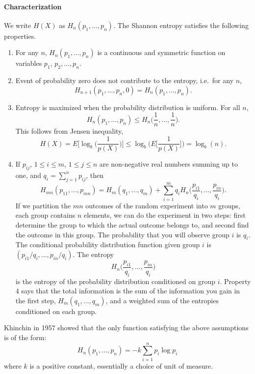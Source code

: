 \documentclass{article}
\begin{document}
\paragraph{Characterization}

We write $H(X)$ as $H_n(p_1,\ldots,p_n)$. The Shannon entropy
satisfies the following properties.

\begin{enumerate}
\item For any $n$, $H_n(p_1,\ldots,p_n)$ is a continuous and
symmetric function on variables $p_1$, $p_2,\ldots, p_n$.

\item Event of probability zero does not contribute to the entropy, i.e.\
for any $n$,
\[
 H_{n+1}(p_1,\ldots,p_n,0) = H_n(p_1,\ldots,p_n).
\]

\item Entropy is maximized when the probability distribution is
uniform. For all $n$,
\[
H_n(p_1,\ldots,p_n) \leq H_n\Big(\frac{1}{n},\ldots,\frac{1}{n}
\Big).
\]
This follows from Jensen inequality,
\[
   H(X) = E\Big[\log_b \Big( \frac{1}{p(X)}\Big) \Big] \leq
   \log_b \Big( E\Big[ \frac{1}{p(X)} \Big] \Big) = \log_b(n).
\]


\item If $p_{ij}$, $1\leq i \leq m$, $1\leq j \leq n$ are
non-negative real numbers summing up to one, and $q_i =
\sum_{j=1}^n p_{ij}$, then
\[
 H_{mn}(p_{11},\ldots, p_{mn}) = H_m(q_1,\ldots,q_m) +
 \sum_{i=1}^m q_i H_n\Big(\frac{p_{i1}}{q_i},\ldots, \frac{p_{in}}{q_i}
 \Big).
\]
If we partition the $mn$ outcomes of the random experiment into
$m$ groups, each group contains $n$ elements, we can do the
experiment in two steps: first determine the group to which the
actual outcome belongs to, and second find the outcome in this
group. The probability that you will observe group $i$ is $q_i$.
The conditional probability distribution function given group $i$
is $(p_{i1}/q_i,\ldots,p_{in}/q_i)$. The entropy
\[
 H_n\Big(\frac{p_{i1}}{q_i},\ldots, \frac{p_{in}}{q_i} \Big)
\]
is the entropy of the probability distribution conditioned on
group $i$. Property 4 says that the total information is the sum
of the information you gain in the first step, $H_m(q_1,\ldots,
q_m)$, and a weighted sum of the entropies conditioned on each
group.
\end{enumerate}


Khinchin in 1957 showed that the only function satisfying the
above assumptions is of the form:
\begin{displaymath}
H_n(p_1,\ldots,p_n) = -k \sum_{i=1}^n p_i \log p_i
\end{displaymath}
where $k$ is a positive constant, essentially a choice of unit of
measure.
\end{document}
